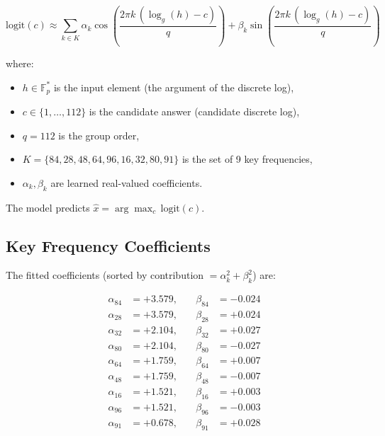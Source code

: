 \documentclass[11pt]{article}
\newcommand{\Fps}{\mathbb{F}_p^*}
\newcommand{\logg}{\log_g}
\begin{document}
\begin{equation}
    \boxed{
    \text{logit}(c) \approx \sum_{k \in K} \alpha_k \cos\!\left(\frac{2\pi k \, (\logg(h) - c)}{q}\right) + \beta_k \sin\!\left(\frac{2\pi k \, (\logg(h) - c)}{q}\right)
    }
    \label{eq:extracted_algo}
\end{equation}

where:
\begin{itemize}[leftmargin=*]
    \item $h \in \Fps$ is the input element (the argument of the discrete log),
    \item $c \in \{1, \ldots, 112\}$ is the candidate answer (candidate discrete log),
    \item $q = 112$ is the group order,
    \item $K = \{84, 28, 48, 64, 96, 16, 32, 80, 91\}$ is the set of 9 key frequencies,
    \item $\alpha_k, \beta_k$ are learned real-valued coefficients.
\end{itemize}

The model predicts $\hat{x} = \arg\max_c \, \text{logit}(c)$.

\subsection{Key Frequency Coefficients}

The fitted coefficients (sorted by contribution $= \alpha_k^2 + \beta_k^2$) are:

\begin{equation}
\begin{aligned}
    \alpha_{84} &= +3.579, \quad &\beta_{84} &= -0.024 \\
    \alpha_{28} &= +3.579, \quad &\beta_{28} &= +0.024 \\
    \alpha_{32} &= +2.104, \quad &\beta_{32} &= +0.027 \\
    \alpha_{80} &= +2.104, \quad &\beta_{80} &= -0.027 \\
    \alpha_{64} &= +1.759, \quad &\beta_{64} &= +0.007 \\
    \alpha_{48} &= +1.759, \quad &\beta_{48} &= -0.007 \\
    \alpha_{16} &= +1.521, \quad &\beta_{16} &= +0.003 \\
    \alpha_{96} &= +1.521, \quad &\beta_{96} &= -0.003 \\
    \alpha_{91} &= +0.678, \quad &\beta_{91} &= +0.028 \\
\end{aligned}
\label{eq:coefficients}
\end{equation}
\end{document}

